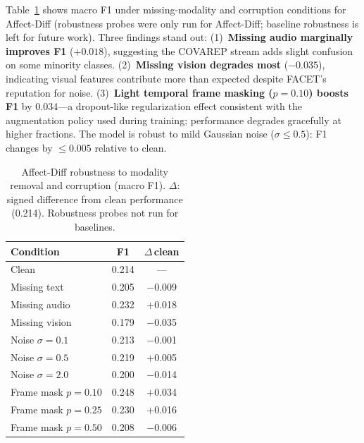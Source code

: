 \documentclass[conference]{IEEEtran}
\begin{document}
Table~\ref{tab:robustness} shows macro F1 under missing-modality and
corruption conditions for Affect-Diff (robustness probes were only run
for Affect-Diff; baseline robustness is left for future work).
Three findings stand out: (1)~\textbf{Missing audio marginally improves
F1} ($+0.018$), suggesting the COVAREP stream adds slight confusion on
some minority classes.  (2)~\textbf{Missing vision degrades most}
($-0.035$), indicating visual features contribute more than expected
despite FACET's reputation for noise.  (3)~\textbf{Light temporal
frame masking ($p=0.10$) boosts F1} by 0.034---a dropout-like
regularization effect consistent with the augmentation policy used
during training; performance degrades gracefully at higher fractions.
The model is robust to mild Gaussian noise ($\sigma \le 0.5$): F1
changes by $\le 0.005$ relative to clean.

\begin{table}[htbp]
\caption{Affect-Diff robustness to modality removal and corruption (macro F1).
$\Delta$: signed difference from clean performance (0.214).
Robustness probes not run for baselines.}
\label{tab:robustness}
\begin{center}
\setlength{\tabcolsep}{5pt}
\begin{tabular}{@{}lcc@{}}
\toprule
\textbf{Condition} & \textbf{F1} & \textbf{$\Delta$\,clean} \\
\midrule
Clean                     & 0.214 & ---      \\
\midrule
Missing text               & 0.205 & $-$0.009 \\
Missing audio              & 0.232 & $+$0.018 \\
Missing vision             & 0.179 & $-$0.035 \\
\midrule
Noise $\sigma=0.1$         & 0.213 & $-$0.001 \\
Noise $\sigma=0.5$         & 0.219 & $+$0.005 \\
Noise $\sigma=2.0$         & 0.200 & $-$0.014 \\
\midrule
Frame mask $p=0.10$        & 0.248 & $+$0.034 \\
Frame mask $p=0.25$        & 0.230 & $+$0.016 \\
Frame mask $p=0.50$        & 0.208 & $-$0.006 \\
\bottomrule
\end{tabular}
\end{center}
\end{table}

\end{document}
